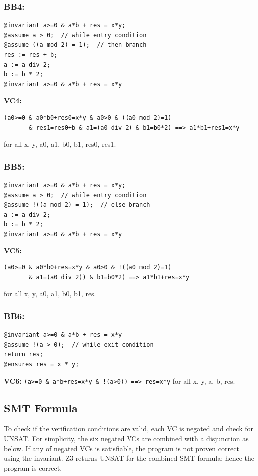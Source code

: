 \documentclass{article}
\begin{document}
\subsubsection*{BB4:}
\begin{verbatim}
@invariant a>=0 & a*b + res = x*y;
@assume a > 0;  // while entry condition
@assume ((a mod 2) = 1);  // then-branch
res := res + b;
a := a div 2;
b := b * 2;
@invariant a>=0 & a*b + res = x*y
\end{verbatim}
\textbf{VC4:}
\begin{verbatim}
(a0>=0 & a0*b0+res0=x*y & a0>0 & ((a0 mod 2)=1) 
       & res1=res0+b & a1=(a0 div 2) & b1=b0*2) ==> a1*b1+res1=x*y
\end{verbatim}
for all x, y, a0, a1, b0, b1, res0, res1.

\subsubsection*{BB5:}
\begin{verbatim}
@invariant a>=0 & a*b + res = x*y;
@assume a > 0;  // while entry condition
@assume !((a mod 2) = 1);  // else-branch
a := a div 2;
b := b * 2;
@invariant a>=0 & a*b + res = x*y
\end{verbatim}
\textbf{VC5:}
\begin{verbatim}
(a0>=0 & a0*b0+res=x*y & a0>0 & !((a0 mod 2)=1) 
       & a1=(a0 div 2)) & b1=b0*2) ==> a1*b1+res=x*y
\end{verbatim}
for all x, y, a0, a1, b0, b1, res.

\subsubsection*{BB6:}
\begin{verbatim}
@invariant a>=0 & a*b + res = x*y
@assume !(a > 0);  // while exit condition
return res;
@ensures res = x * y;
\end{verbatim}
\textbf{VC6:}
\verb|(a>=0 & a*b+res=x*y & !(a>0)) ==> res=x*y| for all x, y, a, b, res.

\subsection*{SMT Formula}
To check if the verification conditions are valid, each VC is negated and check for UNSAT.
For simplicity, the six negated VCs are combined with a disjunction as below.
If any of negated VCs is satisfiable, the program is not proven correct using the invariant.
Z3 returns UNSAT for the combined SMT formula; hence the program is correct.
\end{document}
